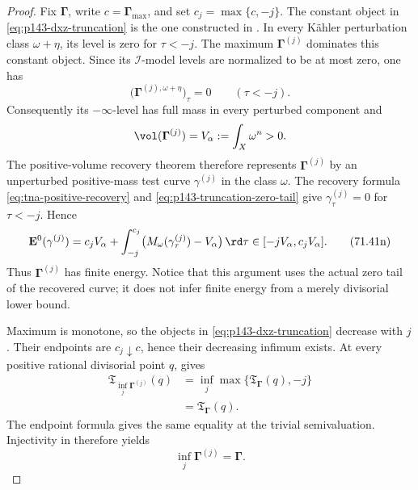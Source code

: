 \begin{proof}
Fix \(\boldsymbol\Gamma\), write
\(c=\boldsymbol\Gamma_{\max}\), and set
\(c_j=\max\{c,-j\}\).  The constant object in
\eqref{eq:p143-dxz-truncation} is the one constructed in
.  In every K\"ahler perturbation class
\(\omega+\eta\), its level is zero for \(\tau<-j\).  The maximum
\(\boldsymbol\Gamma^{(j)}\) dominates this constant object.  Since its
\(\mathcal I\)-model levels are normalized to be at most zero, one has
\[
       \bigl(\boldsymbol\Gamma^{(j),\omega+\eta}\bigr)_\tau=0
       \qquad(\tau<-j).
\tag{71.41m}\label{eq:p143-truncation-zero-tail}
\]
Consequently its \(-\infty\)-level has full mass in every perturbed
component and
\[
             \vol(\boldsymbol\Gamma^{(j)})
             =V_\alpha:=\int_X\omega^n>0.
\]
The positive-volume recovery theorem
 therefore represents
\(\boldsymbol\Gamma^{(j)}\) by an unperturbed positive-mass test curve
\(\gamma^{(j)}\) in the class \(\omega\).  The recovery formula
\eqref{eq:tna-positive-recovery} and
\eqref{eq:p143-truncation-zero-tail} give
\(\gamma^{(j)}_\tau=0\) for \(\tau<-j\).  Hence
\[
 \mathbf E^0(\gamma^{(j)})
 =c_jV_\alpha+
   \int_{-j}^{c_j}
      \bigl(M_\omega(\gamma^{(j)}_\tau)-V_\alpha\bigr)\,\rd\tau
 \in[-jV_\alpha,c_jV_\alpha].
\tag{71.41n}\label{eq:p143-truncation-energy-bound}
\]
Thus \(\boldsymbol\Gamma^{(j)}\) has finite energy.  Notice that this
argument uses the actual zero tail of the recovered curve; it does not
infer finite energy from a merely divisorial lower bound.

Maximum is monotone, so the objects in
\eqref{eq:p143-dxz-truncation} decrease with \(j\).  Their endpoints are
\(c_j\downarrow c\), hence their decreasing infimum exists.  At every
positive rational divisorial point \(q\),
 gives
\[
 \begin{split}
 \mathfrak T_{\inf_j\boldsymbol\Gamma^{(j)}}(q)
   &=\inf_j\max\{\mathfrak T_{\boldsymbol\Gamma}(q),-j\}\\
   &=\mathfrak T_{\boldsymbol\Gamma}(q).
 \end{split}
\]
The endpoint formula gives the same equality at the trivial
semivaluation.  Injectivity in
 therefore yields
\[
                         \inf_j\boldsymbol\Gamma^{(j)}
                         =\boldsymbol\Gamma.
\tag{71.41o}\label{eq:p143-dxz-truncation-limit}
\]


\end{proof}
